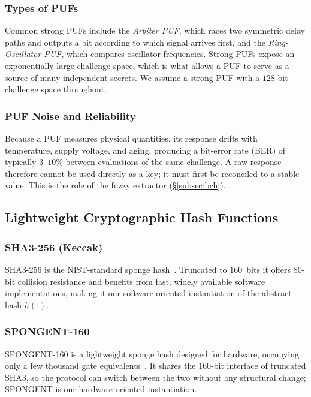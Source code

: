 \documentclass[11pt,a4paper]{article}
\begin{document}
\subsubsection{Types of PUFs}

Common strong PUFs include the \emph{Arbiter PUF}, which races two symmetric
delay paths and outputs a bit according to which signal arrives first, and the
\emph{Ring-Oscillator PUF}, which compares oscillator frequencies. Strong PUFs
expose an exponentially large challenge space, which is what allows a PUF to
serve as a source of many independent secrets. We assume a strong PUF with a
$128$-bit challenge space throughout.

\subsubsection{PUF Noise and Reliability}

Because a PUF measures physical quantities, its response drifts with
temperature, supply voltage, and aging, producing a bit-error rate (BER) of
typically $3$--$10\%$ between evaluations of the same challenge. A raw response
therefore cannot be used directly as a key; it must first be reconciled to a
stable value. This is the role of the fuzzy extractor
(\S\ref{subsec:bch}).

\subsection{Lightweight Cryptographic Hash Functions}

\subsubsection{SHA3-256 (Keccak)}
SHA3-256 is the NIST-standard sponge hash~\cite{sha3_standard,keccak_team}.
Truncated to $160$~bits it offers $80$-bit collision resistance and benefits
from fast, widely available software implementations, making it our
software-oriented instantiation of the abstract hash $h(\cdot)$.

\subsubsection{SPONGENT-160}
SPONGENT-160 is a lightweight sponge hash designed for hardware, occupying only
a few thousand gate equivalents~\cite{spongent_original}. It shares the
$160$-bit interface of truncated SHA3, so the protocol can switch between the
two without any structural change; SPONGENT is our hardware-oriented
instantiation.
\end{document}
